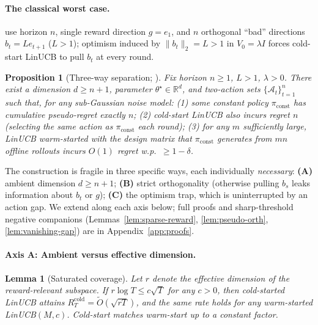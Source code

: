 \documentclass{article}
\newtheorem{lemma}{Lemma}
\newtheorem{proposition}{Proposition}
\theoremstyle{definition}
\theoremstyle{remark}
\theoremstyle{remark}
\begin{document}
\paragraph{The classical worst case.}
\cite{chen2024llmdecision} use horizon $n$, single reward direction $g=e_1$,
and $n$ orthogonal ``bad'' directions $b_t=Le_{t+1}$ ($L>1$); optimism induced
by $\|b_t\|_2\!=\!L\!>\!1$ in $V_0\!=\!\lambda I$ forces cold-start LinUCB to
pull $b_t$ at every round.

\begin{proposition}[Three-way separation; \cite{chen2024llmdecision}]
\label{prop:three-way}
Fix horizon $n\!\ge\!1$, $L\!>\!1$, $\lambda\!>\!0$. There exist a dimension
$d\!\ge\!n+1$, parameter $\theta^\star\!\in\!\mathbb R^d$, and two-action sets
$\{\mathcal A_t\}_{t=1}^n$ such that, for any sub-Gaussian noise model:
(1) some constant policy $\pi_{\mathrm{const}}$ has cumulative pseudo-regret
exactly $n$; (2) cold-start LinUCB also incurs regret $n$ (selecting the same
action as $\pi_{\mathrm{const}}$ each round); (3) for any $m$ sufficiently
large, LinUCB warm-started with the design matrix that $\pi_{\mathrm{const}}$
generates from $mn$ offline rollouts incurs $O(1)$ regret w.p.\ $\ge 1-\delta$.
\end{proposition}

The construction is fragile in three specific ways, each individually
\emph{necessary}: \textbf{(A)} ambient dimension $d\!\ge\!n+1$;
\textbf{(B)} strict orthogonality (otherwise pulling $b_s$ leaks information
about $b_t$ or $g$); \textbf{(C)} the optimism trap, which is uninterrupted
by an action gap. We extend along each axis below; full proofs and
sharp-threshold negative companions
(Lemmas~\ref{lem:sparse-reward}, \ref{lem:pseudo-orth},
\ref{lem:vanishing-gap}) are in Appendix~\ref{app:proofs}.

\paragraph{Axis A: Ambient versus effective dimension.}

\begin{lemma}[Saturated coverage]
\label{lem:low-effective-dim}
Let $r$ denote the effective dimension of the reward-relevant subspace. If
$r\log T\le c\sqrt T$ for any $c>0$, then cold-started LinUCB attains
$R_T^{\mathrm{cold}}=\widetilde O(\sqrt{rT})$, and the same rate holds for
any warm-started LinUCB$(M,c)$. Cold-start matches warm-start up to a
constant factor.
\end{lemma}
\end{document}
